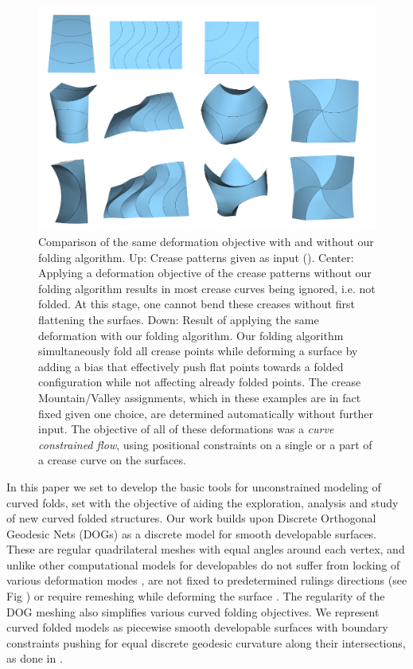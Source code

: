 \begin{figure} [h]
	\centering
	\includegraphics[width=\linewidth]{figures/fold_bias_compare}
	\caption{Comparison of the same deformation objective with and without our folding algorithm. Up: Crease patterns given as input (). Center: Applying a deformation objective of the crease patterns without our folding algorithm results in most crease curves being ignored, i.e. not folded. At this stage, one cannot bend these creases without first flattening the surfaes. Down: Result of applying the same deformation with our folding algorithm. Our folding algorithm simultaneously fold all crease points while deforming a surface by adding a bias that effectively push flat points towards a folded configuration while not affecting already folded points. The crease Mountain/Valley assignments, which in these examples are in fact fixed given one choice, are determined automatically without further input. The objective of all of these deformations was a  \textit{curve constrained flow}, using positional constraints on a single or a part of a crease curve on the surfaces.}
	\label{fig:folded_and_not_folded}
\end{figure}

In this paper we set to develop the basic tools for unconstrained modeling of curved folds, set with the objective of aiding the exploration, analysis and study of new curved folded structures. Our work builds upon Discrete Orthogonal Geodesic Nets (DOGs) \cite{rabi18,rabi2018shape} as a discrete model for smooth developable surfaces. These are regular quadrilateral meshes with equal angles around each vertex, and unlike other computational models for developables do not suffer from locking of various deformation modes \cite{locking1,locking2,grin_shells}, are not fixed to predetermined rulings directions \cite{pottmann_new,curved_folding_kilian} (see Fig ) or require remeshing while deforming the surface \cite{StringActuated:2017,SchreckEG2017,Narain}. The regularity of the DOG meshing also simplifies various curved folding objectives. We represent curved folded models as piecewise smooth developable surfaces with boundary constraints pushing for equal discrete geodesic curvature along their intersections, as done in \cite{rabi2018shape}.

